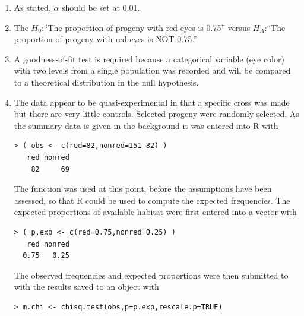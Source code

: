 \documentclass[10pt,openany]{book}\usepackage[]{graphicx}\usepackage[]{color}
\makeatletter
\newenvironment{kframe}{%
 \def\at@end@of@kframe{}%
 \ifinner\ifhmode%
  \def\at@end@of@kframe{\end{minipage}}%
  \begin{minipage}{\columnwidth}%
 \fi\fi%
 \def\FrameCommand##1{\hskip\@totalleftmargin \hskip-\fboxsep
 \colorbox{shadecolor}{##1}\hskip-\fboxsep
     \hskip-\linewidth \hskip-\@totalleftmargin \hskip\columnwidth}%
 \MakeFramed {\advance\hsize-\width
   \@totalleftmargin\z@ \linewidth\hsize
   \@setminipage}}%
 {\par\unskip\endMakeFramed%
 \at@end@of@kframe}
\newenvironment{knitrout}{}{} %
\makeatother
\begin{document}
\begin{enumerate}
  \item As stated, $\alpha$ should be set at 0.01.
  \item The  $H_{0}$:``The proportion of progeny with red-eyes is 0.75'' versus $H_{A}$:``The proportion of progeny with red-eyes is NOT 0.75.''
  \item A goodness-of-fit test is required because a categorical variable (eye color) with two levels from a single population was recorded and will be compared to a theoretical distribution in the null hypothesis.
  \item The data appear to be quasi-experimental in that a specific cross was made but there are very little controls.  Selected progeny were randomly selected.  As the summary data is given in the background it was entered into R with
\begin{knitrout}
\color{fgcolor}\begin{kframe}
\begin{verbatim}
> ( obs <- c(red=82,nonred=151-82) )
   red nonred 
    82     69 
\end{verbatim}
\end{kframe}
\end{knitrout}
The  function was used at this point, before the assumptions have been assessed, so that R could be used to compute the expected frequencies.  The expected proportions of available habitat were first entered into a vector with
\begin{knitrout}
\color{fgcolor}\begin{kframe}
\begin{verbatim}
> ( p.exp <- c(red=0.75,nonred=0.25) )
   red nonred 
  0.75   0.25 
\end{verbatim}
\end{kframe}
\end{knitrout}
The observed frequencies and expected proportions were then submitted to  with the results saved to an object with
\begin{knitrout}
\color{fgcolor}\begin{kframe}
\begin{verbatim}
> m.chi <- chisq.test(obs,p=p.exp,rescale.p=TRUE)
\end{verbatim}
\end{kframe}
\end{knitrout}

\end{enumerate}
\end{document}
